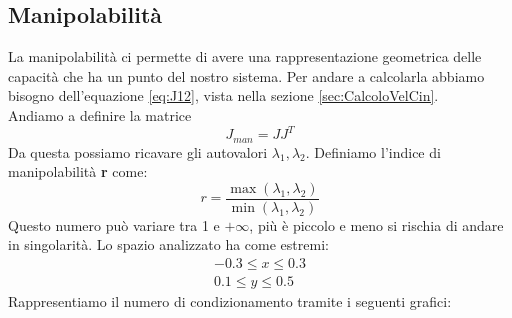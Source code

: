 \subsection{Manipolabilità}
La manipolabilità ci permette di avere una rappresentazione geometrica delle capacità che ha un punto del nostro sistema. Per andare a calcolarla abbiamo bisogno dell'equazione \ref{eq:J12}, vista nella sezione \ref{sec:CalcoloVelCin}.
\\Andiamo a definire la matrice
\begin{equation}
    J_{man} = JJ^T
\end{equation}
Da questa possiamo ricavare gli autovalori $\lambda_1, \lambda_2$. Definiamo  l'indice di manipolabilità \textbf{r} come:
\begin{equation}
    r = \frac{\max(\lambda_1,\lambda_2)}{\min(\lambda_1,\lambda_2)}
\end{equation}
Questo numero può variare tra 1 e $+\infty$, più è piccolo e meno si rischia di andare in singolarità. Lo spazio analizzato ha come estremi:
\begin{equation*}
	\begin{split}
		-0.3 \le x \le 0.3 \\
		0.1 \le y \le 0.5
	\end{split}
\end{equation*} 
Rappresentiamo il numero di condizionamento tramite i seguenti grafici: 
